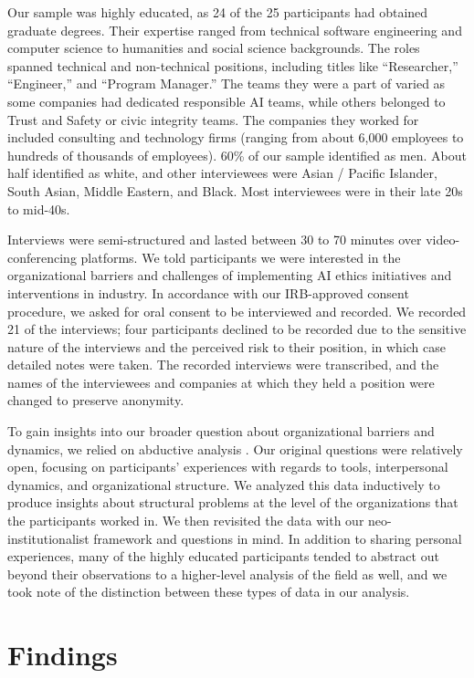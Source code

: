 \documentclass[sigconf]{acmart}
\begin{document}
Our sample was highly educated, as 24 of the 25 participants had obtained graduate degrees. Their expertise ranged from technical software engineering and computer science to humanities and social science backgrounds. The roles spanned technical and non-technical positions, including titles like “Researcher,” “Engineer,” and “Program Manager.”  The teams they were a part of varied as some companies had dedicated responsible AI teams, while others belonged to Trust and Safety or civic integrity teams. The companies they worked for included consulting and technology firms (ranging from about 6,000 employees to hundreds of thousands of employees). 60\% of our sample identified as men. About half identified as white, and other interviewees were Asian / Pacific Islander, South Asian, Middle Eastern, and Black. Most interviewees were in their late 20s to mid-40s. 

Interviews were semi-structured and lasted between 30 to 70 minutes over video-conferencing platforms. We told participants we were interested in the organizational barriers and challenges of implementing AI ethics initiatives and interventions in industry. In accordance with our IRB-approved consent procedure, we asked for oral consent to be interviewed and recorded. We recorded 21 of the interviews; four participants declined to be recorded due to the sensitive nature of the interviews and the perceived risk to their position, in which case detailed notes were taken. The recorded interviews were transcribed, and the names of the interviewees and companies at which they held a position were changed to preserve anonymity. 

To gain insights into our broader question about organizational barriers and dynamics, we relied on abductive analysis \cite{tavory_abductive_2014}. Our original questions were relatively open, focusing on participants’ experiences with regards to tools, interpersonal dynamics, and organizational structure. We analyzed this data inductively to produce insights about structural problems at the level of the organizations that the participants worked in. We then revisited the data with our neo-institutionalist framework and questions in mind. In addition to sharing personal experiences, many of the highly educated participants tended to abstract out beyond their observations to a higher-level analysis of the field as well, and we took note of the distinction between these types of data in our analysis. 


\section{Findings}
\end{document}
